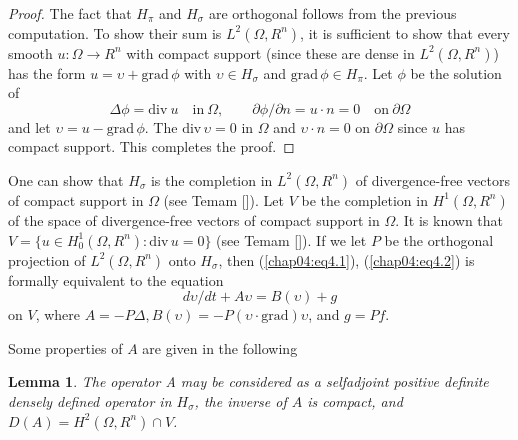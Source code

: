 \documentclass{surv-l}
\theoremstyle{plain}
\newtheorem{lemma}[theorem]{Lemma}
\theoremstyle{definition}
\numberwithin{equation}{section}
\numberwithin{figure}{chapter}
\begin{document}
\begin{proof} The fact that $H_{\pi}$ and $H_{\sigma}$ are orthogonal follows from the previous computation. To show their sum is $L^{2}(\Omega,R^{n})$, it is sufficient to show that every smooth $u\!:\Omega \rightarrow R^{n}$ with compact support (since these are dense in $L^{2}(\Omega, R^{n})$) has the form $u=\upsilon+\mathrm{grad}\,\phi$ with $\upsilon\in H_{\sigma}$ and $\mathrm{grad}\, \phi\in H_{\pi}$. Let $\phi$ be the solution of
\begin{equation*}
\Delta\phi=\mathrm{div}\ u\quad \mathrm{in}\ \Omega,\qquad \partial\phi/\partial n=u\cdot n=0\quad \mathrm{on}\ \partial\Omega
\end{equation*}
and let $ \upsilon=u-\mathrm{grad}\,\phi$. The $\mathrm{div}\, \upsilon=0$ in $\Omega$ and $\upsilon\cdot n=0$ on $\partial\Omega$ since $u$ has compact support. This completes the proof.
\end{proof}

One can show that $H_{\sigma}$ is the completion in $L^{2}(\Omega, R^{n})$ of divergence-free vectors of compact support in $\Omega$ (see Temam [\citeyear{1979t}]). Let $V$ be the completion in $H^{1}(\Omega, R^{n})$ of the space of divergence-free vectors of compact support in $\Omega$. It is known that $V=\{u\in H_{0}^{1}(\Omega, R^{n})\!:\mathrm{div}\, u=0\}$ (see Temam [\citeyear{1979t}]). If we let $P$ be the orthogonal projection of $L^{2}(\Omega, R^{n})$ onto $H_{\sigma}$, then (\ref{chap04:eq4.1}), (\ref{chap04:eq4.2}) is formally equivalent to the equation
\begin{equation}\label{chap04:eq4.4}
d\upsilon/dt+A\upsilon=B(\upsilon)+g
\end{equation}
on $V$, where $ A=-P\Delta,B(\upsilon)=-P(\upsilon\cdot \mathrm{grad})\upsilon$, and $g=Pf$.


Some properties of $A$ are given in the following

\begin{lemma}\label{lem4.4.2} The operator A may be considered as a selfadjoint positive definite densely defined operator in $H_{\sigma}$, the inverse of $A$ is compact, and $D(A)= H^{2}(\Omega, R^{n})\cap V$.
\end{lemma}
\end{document}
